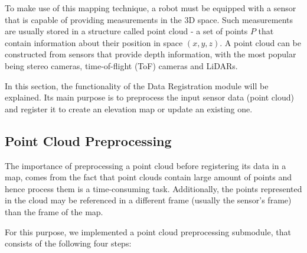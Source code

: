 
To make use of this mapping technique, a robot must be equipped with a
sensor that is capable of providing measurements in the 3D space.
Such measurements are usually stored in a structure called point cloud -
a set of points $P$ that contain information about their position in
space $(x,y,z)$.
A point cloud can be constructed from sensors that provide depth information,
with the most popular being stereo cameras, time-of-flight (ToF) cameras
and LiDARs.


In this section, the functionality of the Data Registration module will be
explained.
Its main purpose is to preprocess the input sensor data (point cloud)
and register it to create an elevation map or update an existing one.

\subsection{Point Cloud Preprocessing} \label{point_cloud_processing}

The importance of preprocessing a point cloud before registering its data
in a map, comes from the fact that point clouds contain large amount of points
and hence process them is a time-consuming task.
Additionally, the points represented in the cloud may be referenced in a
different frame (usually the sensor's frame) than the frame of the map.

For this purpose, we implemented a point cloud preprocessing submodule,
that consists of the following four steps:

